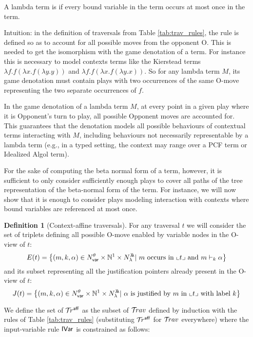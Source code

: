 \documentclass{article}
\theoremstyle{definition}
\newtheorem{definition}{Definition}[section]
\newcommand\Nodes{N}%
\newcommand\NodesVar{N_{\sf var}}%
\newcommand\NodesLmd{N_\lambda}%
\newcommand{\ghostlmd}{{\lambda\!\!\lambda}}
\newcommand{\ghostvar}{\theta}
\newcommand{\affine}{{\sf aff}}
\newcommand\travsetshort{\mathcal{T}\!r}
\newcommand{\travsetaffine}{{\travsetshort^\affine}}
\newcommand{\NodeHjByRoot}{\Nodes^{\filter\theroot}}
\newcommand{\rulefont}[1]{\mathbf{\sf #1}}
\newcommand{\enables}{\vdash}
\begin{document}
A lambda term is  if every bound variable in the term occurs at most once in the term.

Intuition: in the definition of traversals from Table \ref{tab:trav_rules}, the rule  is defined so as to account for all possible moves from the opponent O. This is needed to get the isomorphism with the game denotation of a term. For instance this is necessary to model contexts terms like the Kierstead terms $\lambda f.f(\lambda x.f(\lambda y.y))$ and $\lambda f.f(\lambda x.f(\lambda y.x))$. So for any lambda term $M$, its game denotation must contain plays with two occurrences of the same O-move representing the two separate occurrences of $f$.

In the game denotation of a lambda term $M$, at every point in a given play where it is Opponent's turn to play, all possible Opponent moves are accounted for. This guarantees that the denotation models all possible behaviours of contextual terms interacting with $M$, including behaviours not necessarily representable by a lambda term (e.g., in a typed setting, the context may range over a PCF term or Idealized Algol term).

For the sake of computing the beta normal form of a term, however, it is sufficient to only consider sufficiently enough plays to cover all paths of the tree representation of the beta-normal form of the term. For instance, we will now show that it is enough to consider plays modeling interaction with contexts where bound variables are referenced at most once.

\begin{definition}[Context-affine traversals]
For any traversal $t$ we will consider the set of triplets defining all possible O-move enabled by variable nodes in the O-view of $t$:
$$ E(t) = \left\{ (m, k, \alpha) \in \NodesVar^\ghostvar\times\nat^1\times \NodesLmd^\ghostlmd |\ \mbox{$m$ occurs in $\oview{t}$ and $m\enables_k\alpha$} \right\}
$$
and its subset representing all the justification pointers already present in the O-view of $t$:
$$ J(t) = \left\{ (m, k, \alpha) \in \NodesVar^\ghostvar\times\nat^1\times \NodesLmd^\ghostlmd
|\ \mbox{$\alpha$ is justified by $m$ in $\oview{t}$ with label $k$} \right\}
$$

We define the set of  $\travsetaffine$ as the subset of $\mathcal{T}\!rav$ defined by induction with the rules of Table \ref{tab:trav_rules} (substituting $\travsetaffine$ for $\mathcal{T}\!rav$ everywhere) where the input-variable rule $\rulefont{IVar}$ is constrained as follows:

\infrule[$\rulefont{IVar}_\affine$]
     {
            t = t_1 \cdot m \cdot t_2 \in \travsetaffine
            \andalso t^\omega \in \NodeHjByRoot \inter \NodesVar
            \andalso (m,k,\alpha) \in E(t) \setminus J(t)
            \andalso k \geq 1
     }
     { \in \travsetaffine}
\end{definition}
\end{document}

